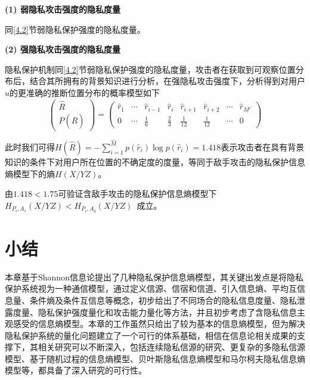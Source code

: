 \textbf{(1) 弱隐私攻击强度的隐私度量}

同\ref{4.2}节弱隐私保护强度的隐私度量。

\textbf{(2) 强隐私攻击强度的隐私度量}

隐私保护机制同\ref{4.2}节弱隐私保护强度的隐私度量，攻击者在获取到可观察位置分布后，结合其所拥有的背景知识进行分析，在强隐私攻击强度下，分析得到对用户$u$的更准确的推断位置分布的概率模型如下
\begin{equation}
\begin{pmatrix}
\hat{R}\\ 
P(\hat{R})
\end{pmatrix}=\begin{pmatrix}
\hat{r}_{1} & \cdots & \hat{r}_{i-1}  & \hat{r}_{i} & \hat{r}_{i+1} & \hat{r}_{i+2} & \cdots  & \hat{r}_{{M}'}\\ 
0 & \cdots  & \frac{1}{6} & \frac{2}{3} & \frac{1}{12} & \frac{1}{12} & \cdots  & 0
\end{pmatrix}
\end{equation}

此时我们可得$H(\hat{R})=-\sum_{i=1}^{\hat{M}}p(\hat{r}_{i})\log p(\hat{r}_{i})=1.418$表示攻击者在具有背景知识的条件下对用户所在位置的不确定度的度量，等同于敌手攻击的隐私保护信息熵模型下的熵$H(X/YZ)$。

由$1.418<1.75$可验证含敌手攻击的隐私保护信息熵模型下~$H_{P_{i},A_{r}}(X/YZ)<H_{P_{i},A_{q}}(X/YZ)$~成立。

\section{小结}\label{sconclusion}

本章基于Shannon信息论提出了几种隐私保护信息熵模型，其关键出发点是将隐私保护系统视为一种通信模型，通过定义信源、信宿和信道、引入信息熵、平均互信息量、条件熵及条件互信息等概念，初步给出了不同场合的隐私信息度量、隐私泄露度量、隐私保护强度量化和攻击能力量化等方法，并且初步考虑了含隐私信息主观感受的信息熵模型。本章的工作虽然只给出了较为基本的信息熵模型，但为解决隐私保护系统的量化问题建立了一个可行的体系基础，相信在信息论相关成果的支撑下，其相关研究可以不断深入，包括连续隐私信源的研究、更复杂的多隐私信源模型、基于随机过程的信息熵模型、贝叶斯隐私信息熵模型和马尔柯夫隐私信息熵模型等，都具备了深入研究的可行性。












